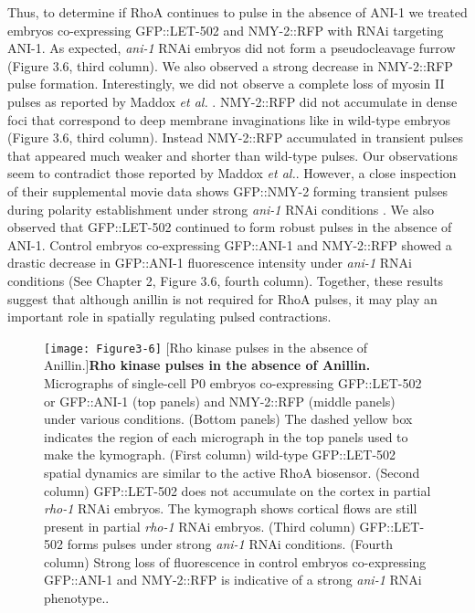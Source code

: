 \documentclass{ucetd}
\begin{document}
Thus, to determine if RhoA continues to pulse in the absence of ANI-1 we treated embryos co-expressing GFP::LET-502 and NMY-2::RFP with RNAi targeting ANI-1.  As expected, \textit{ani-1} RNAi embryos did not form a pseudocleavage furrow (Figure 3.6, third column).  We also observed a strong decrease in NMY-2::RFP pulse formation.  Interestingly, we did not observe a complete loss of myosin II pulses as reported by Maddox \textit{et al.} \cite{Maddox:2005gd}.  NMY-2::RFP did not accumulate in dense foci that correspond to deep membrane invaginations like in wild-type embryos (Figure 3.6, third column).  Instead NMY-2::RFP accumulated in transient pulses that appeared much weaker and shorter than wild-type pulses.  Our observations seem to contradict those reported by Maddox \textit{et al.}.  However, a close inspection of their supplemental movie data shows GFP::NMY-2 forming transient pulses during polarity establishment under strong \textit{ani-1} RNAi conditions \cite{Maddox:2005gd}.  We also observed that GFP::LET-502 continued to form robust pulses in the absence of ANI-1.  Control embryos co-expressing GFP::ANI-1 and NMY-2::RFP showed a drastic decrease in GFP::ANI-1 fluorescence intensity under \textit{ani-1} RNAi conditions (See Chapter 2, Figure 3.6, fourth column).  Together, these results suggest that although anillin is not required for RhoA pulses, it may play an important role in spatially regulating pulsed contractions.

\begin{figure}[!htbp]
\centering
\texttt{[image: Figure3-6]}
[Rho kinase pulses in the absence of Anillin.]{\textbf{Rho kinase pulses in the absence of Anillin.} Micrographs of single-cell P0 embryos co-expressing GFP::LET-502 or GFP::ANI-1 (top panels) and NMY-2::RFP (middle panels) under various conditions.  (Bottom panels) The dashed yellow box indicates the region of each micrograph in the top panels used to make the kymograph.  (First column) wild-type GFP::LET-502 spatial dynamics are similar to the active RhoA biosensor.  (Second column) GFP::LET-502 does not accumulate on the cortex in partial \textit{rho-1} RNAi embryos. The kymograph shows cortical flows are still present in partial \textit{rho-1} RNAi embryos.  (Third column) GFP::LET-502 forms pulses under strong \textit{ani-1} RNAi conditions.  (Fourth column) Strong loss of fluorescence in control embryos co-expressing GFP::ANI-1 and NMY-2::RFP is indicative of a strong \textit{ani-1} RNAi phenotype..}
\end{figure}
\end{document}
